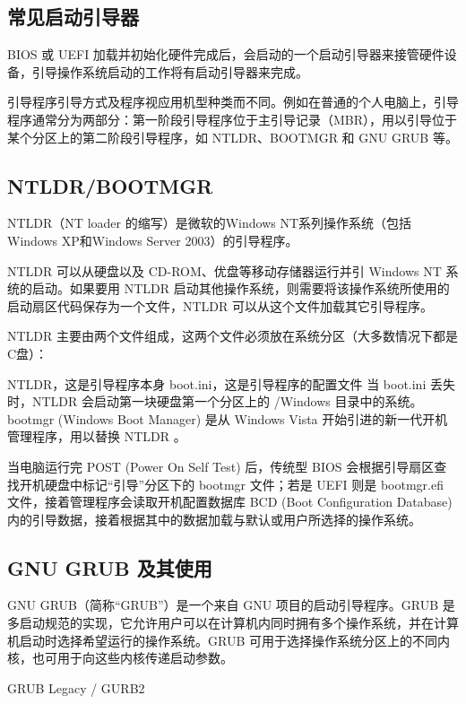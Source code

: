 \documentclass[doctor,openright,twoside]{sjtuthesis}
\theoremstyle{plain}
\theoremstyle{definition}
\theoremstyle{remark}
\theoremstyle{ocrenumbox}
\theoremstyle{plain}
\newcommand\cqh{“}
\newcommand\cqt{”}
\begin{document}
\subsection{常见启动引导器}

BIOS 或 UEFI
加载并初始化硬件完成后，会启动的一个启动引导器来接管硬件设备，引导操作系统启动的工作将有启动引导器来完成。

引导程序引导方式及程序视应用机型种类而不同。例如在普通的个人电脑上，引导程序通常分为两部分：第一阶段引导程序位于主引导记录（MBR），用以引导位于某个分区上的第二阶段引导程序，如
NTLDR、BOOTMGR 和 GNU GRUB 等。

\hypertarget{ntldrbootmgr}{%
\subsection{NTLDR/BOOTMGR}\label{ntldrbootmgr}}

NTLDR（NT loader 的缩写）是微软的Windows NT系列操作系统（包括Windows
XP和Windows Server 2003）的引导程序。

NTLDR 可以从硬盘以及 CD-ROM、优盘等移动存储器运行并引 Windows NT
系统的启动。如果要用 NTLDR
启动其他操作系统，则需要将该操作系统所使用的启动扇区代码保存为一个文件，NTLDR
可以从这个文件加载其它引导程序。

NTLDR
主要由两个文件组成，这两个文件必须放在系统分区（大多数情况下都是C盘）：

NTLDR，这是引导程序本身 boot.ini，这是引导程序的配置文件 当 boot.ini
丢失时，NTLDR 会启动第一块硬盘第一个分区上的 /Windows 目录中的系统。
bootmgr (Windows Boot Manager) 是从 Windows Vista
开始引进的新一代开机管理程序，用以替换 NTLDR 。

当电脑运行完 POST (Power On Self Test) 后，传统型 BIOS
会根据引导扇区查找开机硬盘中标记\cqh 引导\cqt 分区下的 bootmgr
文件；若是 UEFI 则是 bootmgr.efi 文件，接着管理程序会读取开机配置数据库
BCD (Boot Configuration Database)
内的引导数据，接着根据其中的数据加载与默认或用户所选择的操作系统。

\hypertarget{gnu-grub-}{%
\subsection{GNU GRUB 及其使用}\label{gnu-grub-}}

GNU GRUB（简称``GRUB''）是一个来自 GNU 项目的启动引导程序。GRUB
是多启动规范的实现，它允许用户可以在计算机内同时拥有多个操作系统，并在计算机启动时选择希望运行的操作系统。GRUB
可用于选择操作系统分区上的不同内核，也可用于向这些内核传递启动参数。

GRUB Legacy / GURB2
\end{document}
